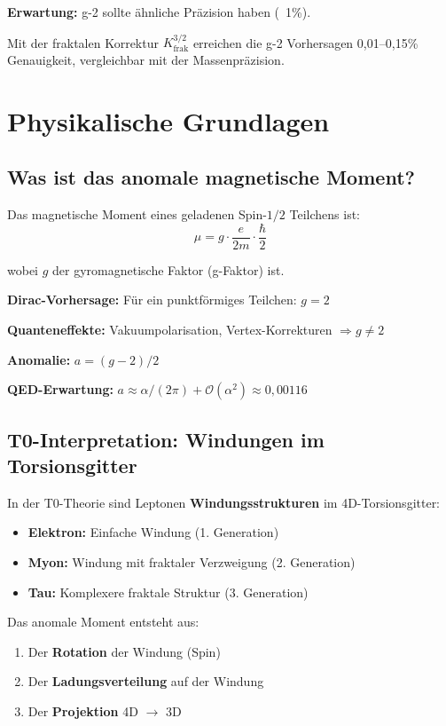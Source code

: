 	\textbf{Erwartung:} g-2 sollte ähnliche Präzision haben (~1\%).
	
	Mit der fraktalen Korrektur $K_\text{frak}^{3/2}$ erreichen die g-2 Vorhersagen 0{,}01--0{,}15\% Genauigkeit, vergleichbar mit der Massenpräzision.
	
	\section{Physikalische Grundlagen}
	
	\subsection{Was ist das anomale magnetische Moment?}
	
	Das magnetische Moment eines geladenen Spin-$1/2$ Teilchens ist:
	\begin{equation}
		\mu = g \cdot \frac{e}{2m} \cdot \frac{\hbar}{2}
	\end{equation}
	
	wobei $g$ der gyromagnetische Faktor (g-Faktor) ist.
	
	\textbf{Dirac-Vorhersage:} Für ein punktförmiges Teilchen: $g = 2$
	
	\textbf{Quanteneffekte:} Vakuumpolarisation, Vertex-Korrekturen $\Rightarrow g \neq 2$
	
	\textbf{Anomalie:} $a = (g-2)/2$
	
	\textbf{QED-Erwartung:} $a \approx \alpha/(2\pi) + \mathcal{O}(\alpha^2) \approx 0{,}00116$
	
	\subsection{T0-Interpretation: Windungen im Torsionsgitter}
	
	In der T0-Theorie sind Leptonen \textbf{Windungsstrukturen} im 4D-Torsionsgitter:
	
	\begin{itemize}
		\item \textbf{Elektron:} Einfache Windung (1. Generation)
		\item \textbf{Myon:} Windung mit fraktaler Verzweigung (2. Generation)
		\item \textbf{Tau:} Komplexere fraktale Struktur (3. Generation)
	\end{itemize}
	
	Das anomale Moment entsteht aus:
	\begin{enumerate}
		\item Der \textbf{Rotation} der Windung (Spin)
		\item Der \textbf{Ladungsverteilung} auf der Windung
		\item Der \textbf{Projektion} 4D $\to$ 3D
	\end{enumerate}
	
